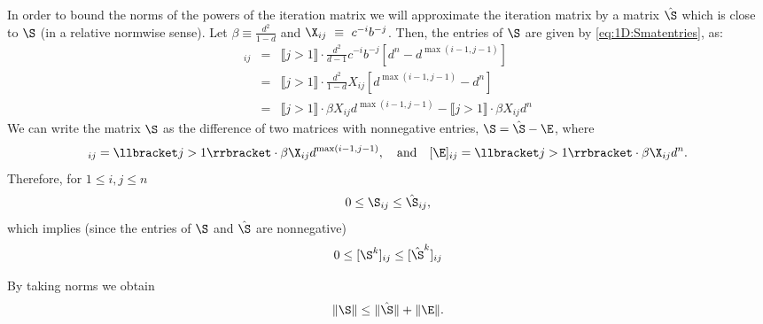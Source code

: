 In order to bound the norms of the powers of the iteration matrix we will
approximate the iteration matrix by a matrix $\hat \S$ which is close to $\S$
(in a relative normwise sense). Let $\beta\equiv\frac{d^2}{1-d}$ and
$\X_{ij}~\equiv~c^{-i}b^{-j}$. Then, the entries of $\S$ are given by
\eqref{eq:1D:Smatentries}, as:
\begin{eqnarray*}
[\S]_{ij}&=& \llbracket j>1\rrbracket \cdot
\frac{d^2}{d-1}c^{-i}b^{-j}\left[d^{n}-d^{\max(i-1,j-1)}\right]\\
&=& \llbracket j>1\rrbracket\cdot \frac{d^2}{1-d}
X_{ij}\left[d^{\max(i-1,j-1)}-d^{n}\right]\nonumber\\
&=& \llbracket j>1\rrbracket\cdot \beta X_{ij} d^{\max(i-1,j-1)} - \llbracket
j>1\rrbracket\cdot \beta X_{ij} d^{n}
\end{eqnarray*}
We can write the matrix $\S$ as the difference of two matrices with nonnegative
entries, $\S=\hat{\S}-\E$, where
\begin{equation}
[\hat{\S}]_{ij}=\llbracket j>1\rrbracket\cdot\beta \X_{ij} d^{\max(i-1,j-1)},\quad
\text{and} \quad [\E]_{ij}=\llbracket j>1\rrbracket\cdot\beta
\X_{ij}d^n.\label{eq:1D:defS_hat}
\end{equation}
Therefore, for $1 \leq i,j \leq n$
\[ 0 \leq \S_{ij}  \leq \hat{\S}_{ij}, \]
which implies (since the entries of $\S$ and $\hat{\S}$ are nonnegative)
\[ 0 \leq [\S^{k}]_{ij} \leq [\hat{\S}^{k}]_{ij} \]

By taking norms we obtain
\begin{equation*}
\|\S\|\leq\|\hat{\S}\|+\|\E\|.
\end{equation*}

